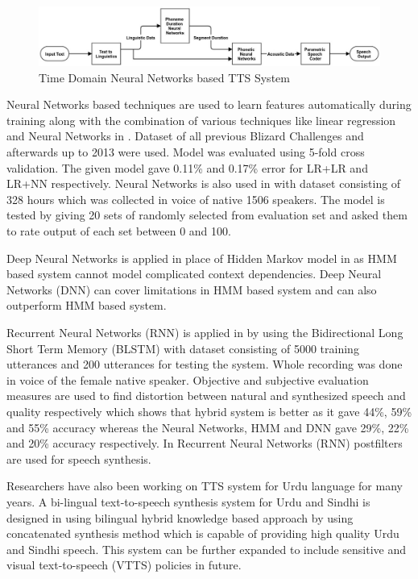\begin{center}
	\begin{figure}[hbtp]
		\centering
		\includegraphics[width=\linewidth]{images/time_domain_neural_network.jpg}
		\caption{Time Domain Neural Networks based TTS System}
		\label{fig:Time Domain Neural Networks based TTS System}
	\end{figure}
		
\end{center}
Neural Networks based techniques are used to learn features automatically during training along with the combination of various techniques 
like linear regression and Neural Networks in \cite{yoshimura2016hierarchical}. Dataset of all previous Blizard Challenges \cite{blizzard_2009_corpus} and
afterwards up to 2013 were used. Model was evaluated using 5-fold cross validation. The given model gave 0.11\% and 0.17\% error for LR+LR and LR+NN 
respectively. Neural Networks is also used in \cite{wu2016merlin} with dataset consisting of 328 hours which was collected in
voice of native 1506 speakers. The model is tested by giving 20 sets of randomly selected from
evaluation set and asked them to rate output of each set between 0 and 100.

Deep Neural Networks is applied in place of Hidden Markov model in \cite{ze2013statistical} as HMM
based system cannot model complicated context dependencies. Deep Neural Networks (DNN) can
cover limitations in HMM based system and can also outperform HMM based system. 

Recurrent Neural Networks (RNN) is applied in \cite{fan2014tts} by using the Bidirectional Long
Short Term Memory (BLSTM) with dataset consisting of 5000 training utterances and 200
utterances for testing the system. Whole recording was done in voice of the female native speaker.
Objective and subjective evaluation measures are used to find distortion between natural and
synthesized speech and quality respectively which shows that hybrid system is better as
it gave 44\%, 59\% and 55\% accuracy whereas the Neural Networks, HMM and DNN gave 29\%,
22\% and 20\% accuracy respectively. In \cite{muthukumar2016recurrent} Recurrent Neural Networks (RNN) postfilters 
are used for speech synthesis. 

Researchers have also been working on TTS system for Urdu language for many years. A bi-lingual text-to-speech synthesis 
system for Urdu and Sindhi is designed in \cite{shah2004bi} using bilingual hybrid knowledge based approach by using concatenated synthesis method which is capable of providing high quality  Urdu and Sindhi speech. This system can be further expanded to include sensitive and visual text-to-speech (VTTS) policies in future.

